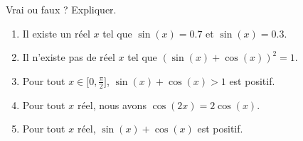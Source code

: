
\begin{exercice}\label{exosmath-0447}

    Vrai ou faux ? Expliquer.
    \begin{multicols}{2}
        \begin{enumerate}
            \item
                Il existe un réel \( x\) tel que \( \sin(x)=0.7\) et \( \sin(x)=0.3\).
            \item
                Il n'existe pas de réel \( x\) tel que \( (\sin(x)+\cos(x))^2=1\).
            \item
                Pour tout \( x\in\mathopen[ 0 , \frac{ \pi }{2} \mathclose]\), \( \sin(x)+\cos(x)>1\) est positif.
            \item
                Pour tout \( x\) réel, nous avons \( \cos(2x)=2\cos(x)\).
            \item
                Pour tout \( x\) réel, \( \sin(x)+\cos(x)\) est positif.
        \end{enumerate}
    \end{multicols}
    

\end{exercice}
